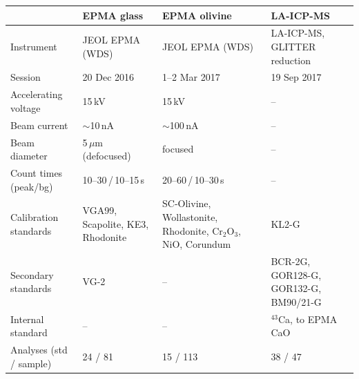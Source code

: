 \begin{tabular}{@{}p{2.6cm}p{3.1cm}p{4.2cm}p{4.2cm}@{}}
\toprule
& EPMA glass & EPMA olivine & LA-ICP-MS \\
\midrule
Instrument & JEOL EPMA (WDS) & JEOL EPMA (WDS) & LA-ICP-MS, GLITTER reduction \\
Session & 20 Dec 2016 & 1--2 Mar 2017 & 19 Sep 2017 \\
Accelerating voltage & 15\,kV & 15\,kV & -- \\
Beam current & $\sim$10\,nA & $\sim$100\,nA & -- \\
Beam diameter & 5\,$\mu$m (defocused) & focused & -- \\
Count times (peak/bg) & 10--30\,/\,10--15\,s & 20--60\,/\,10--30\,s & -- \\
Calibration standards & VGA99, Scapolite, KE3, Rhodonite & SC-Olivine, Wollastonite, Rhodonite, Cr$_2$O$_3$, NiO, Corundum & KL2-G \\
Secondary standards & VG-2 & -- & BCR-2G, GOR128-G, GOR132-G, BM90/21-G \\
Internal standard & -- & -- & $^{43}$Ca, to EPMA CaO \\
Analyses (std / sample) & 24 / 81 & 15 / 113 & 38 / 47 \\
\bottomrule
\end{tabular}
